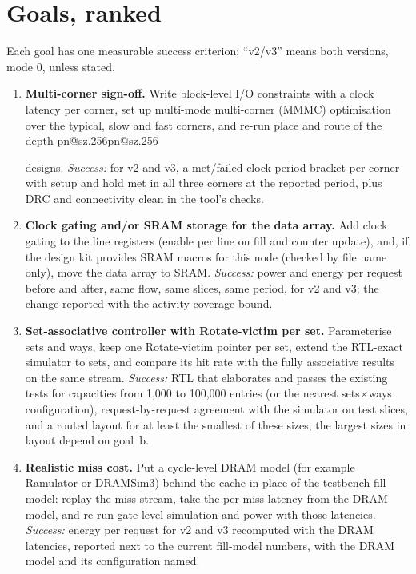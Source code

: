\documentclass[11pt,a4paper]{article}
\makeatletter
\newcommand{\R}[1]{\ifcsname pn@#1\endcsname\csname pn@#1\endcsname\else
  \PackageError{plan}{number key '#1' is not defined in paper/v2/macros.tex}{}\fi}
\makeatother
\begin{document}
\section{Goals, ranked}
Each goal has one measurable success criterion; ``v2/v3'' means both versions, mode 0, unless stated.

\begin{enumerate}[label=\textbf{\alph*.},leftmargin=1.6em]
\item \textbf{Multi-corner sign-off.} Write block-level I/O constraints with a clock latency per corner, set up
multi-mode multi-corner (MMMC) optimisation over the typical, slow and fast corners, and re-run place and route of
the depth-\R{sz.256} designs.
\emph{Success:} for v2 and v3, a met/failed clock-period bracket per corner with setup and hold met in all three
corners at the reported period, plus DRC and connectivity clean in the tool's checks.

\item \textbf{Clock gating and/or SRAM storage for the data array.} Add clock gating to the line registers (enable per
line on fill and counter update), and, if the design kit provides SRAM macros for this node (checked by file name
only), move the data array to SRAM.
\emph{Success:} power and energy per request before and after, same flow, same slices, same period, for v2 and v3;
the change reported with the activity-coverage bound.

\item \textbf{Set-associative controller with Rotate-victim per set.} Parameterise sets and ways, keep one
Rotate-victim pointer per set, extend the RTL-exact simulator to sets, and compare its hit rate with the
fully associative results on the same stream.
\emph{Success:} RTL that elaborates and passes the existing tests for capacities from 1,000 to 100,000 entries (or
the nearest sets$\times$ways configuration), request-by-request agreement with the simulator on test slices, and a
routed layout for at least the smallest of these sizes; the largest sizes in layout depend on goal~b.

\item \textbf{Realistic miss cost.} Put a cycle-level DRAM model (for example Ramulator or DRAMSim3) behind the cache
in place of the testbench fill model: replay the miss stream, take the per-miss latency from the DRAM model, and
re-run gate-level simulation and power with those latencies.
\emph{Success:} energy per request for v2 and v3 recomputed with the DRAM latencies, reported next to the current
fill-model numbers, with the DRAM model and its configuration named.


\end{enumerate}
\end{document}
